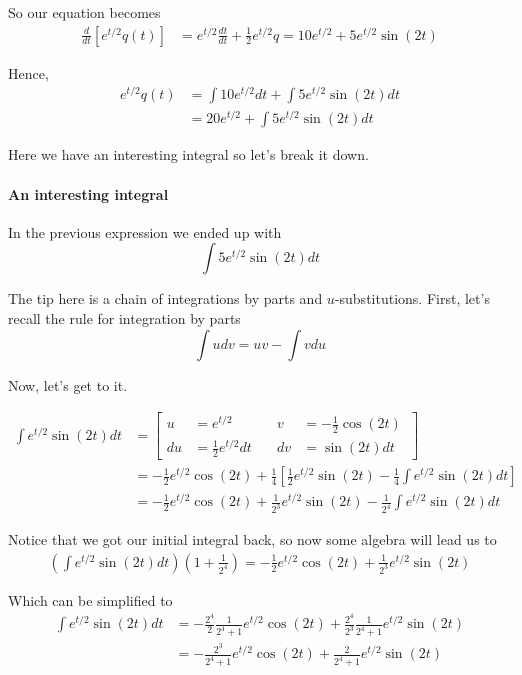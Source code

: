 So our equation becomes
\begin{align*}
\frac{d}{dt} \left[ e^{t/2} q(t) \right] &= e^{t/2} \frac{dt}{dt} + \frac{1}{2} e^{t/2} q = 10 e^{t/2} + 5 e^{t/2} \sin(2t)
\end{align*}

Hence,
\begin{align*}
e^{t/2} q(t) &= \int 10 e^{t/2} dt + \int 5 e^{t/2} \sin(2t) dt \\
&= 20 e^{t/2} + \int 5 e^{t/2} \sin(2t) dt
\end{align*}

Here we have an interesting integral so let's break it down.

\paragraph{An interesting integral}

In the previous expression we ended up with
$$
\int 5 e^{t/2} \sin(2t) dt
$$

The tip here is a chain of integrations by parts and $u$-substitutions.
First, let's recall the rule for integration by parts
$$
\int u dv = uv - \int v du
$$

Now, let's get to it.

\begin{align*}
    \int e^{t/2} \sin(2t) dt &= 
    \left[
      \begin{alignedat}{2}
      u  &= e^{t/2}               \quad & v  &= -\frac{1}{2}\cos(2t) \\
      du &= \frac{1}{2}e^{t/2}dt  \quad & dv &= \sin(2t) dt 
      \end{alignedat}\,
    \right] \\
    &=
    -\frac{1}{2}e^{t/2}\cos(2t) + \frac{1}{4} \left[ 
        \frac{1}{2}e^{t/2}\sin(2t) - \frac{1}{4} \int e^{t/2} \sin(2t) dt
    \right] \\
    &= -\frac{1}{2}e^{t/2}\cos(2t) + \frac{1}{2^3} e^{t/2}\sin(2t)
      - \frac{1}{2^4} \int e^{t/2}\sin(2t) dt
\end{align*}

Notice that we got our initial integral back, so now some algebra will lead us to
\begin{align*}
\left( \int e^{t/2}\sin(2t) dt \right) \left(1 + \frac{1}{2^4} \right) =
-\frac{1}{2}e^{t/2}\cos(2t) + \frac{1}{2^3} e^{t/2}\sin(2t)
\end{align*}

Which can be simplified to
\begin{align*}
\int e^{t/2}\sin(2t) dt   &=
-\frac{2^4}{2}\frac{1}{2^4+1} e^{t/2}\cos(2t) + \frac{2^4}{2^3}\frac{1}{2^4+1} e^{t/2}\sin(2t) \\
&= -\frac{2^3}{2^4+1}e^{t/2}\cos(2t) + \frac{2}{2^4+1} e^{t/2}\sin(2t)
\end{align*}
\\~\\

